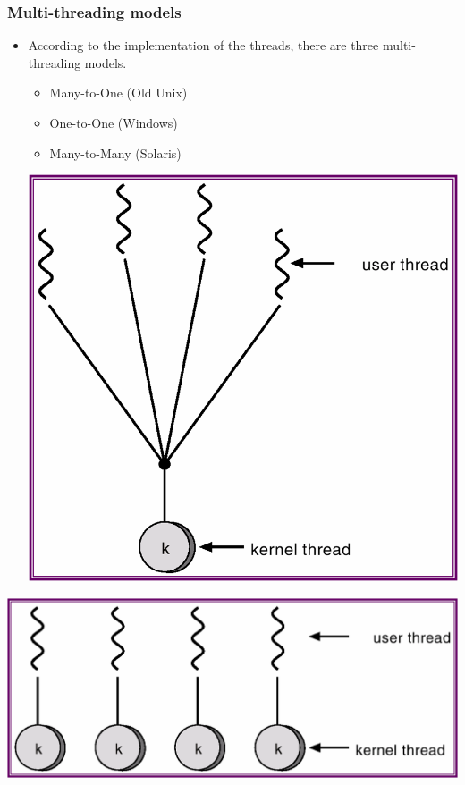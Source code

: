 \documentclass[CJKutf8,xcolor=pdftex,dvipsnames,table]{beamer}
\begin{document}
\begin{CJK*}{UTF8}{song}
  \begin{frame}
  \frametitle{Multi-threading models} \pause
  \begin{minipage}[c]{0.5\textwidth}
    \begin{itemize}
    \item{According to the implementation of the threads, there are three multi-threading models.} \pause
      \begin{itemize}
      \item{Many-to-One (Old Unix)} \pause
      \item{One-to-One (Windows)} \pause
      \item{Many-to-Many (Solaris)} \pause
      \end{itemize}
      \includegraphics[scale=0.3]{v6f5-2} \pause
    \end{itemize}
  \end{minipage}%
  \begin{minipage}[c]{0.5\textwidth}
    \begin{center}
      \includegraphics[scale=0.3]{v6f5-3}\\ \pause

\end{center}
\end{minipage}
\end{frame}
\end{CJK*}
\end{document}
